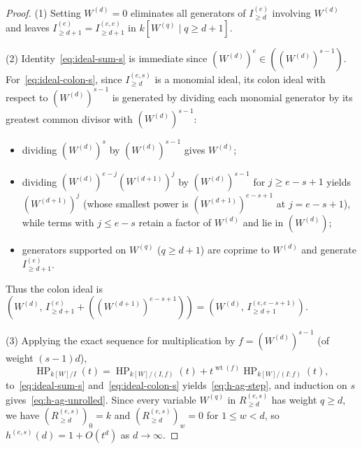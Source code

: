 \documentclass[a4paper, 12pt]{amsart}
\theoremstyle{remark}
\begin{document}
\begin{proof}
(1) Setting $W^{(d)} = 0$ eliminates all generators of $I_{\ge d}^{(e)}$ involving $W^{(d)}$ and leaves $I_{\ge d + 1}^{(e)} = I_{\ge d + 1}^{(e, e)}$ in $k[W^{(q)} \mid q \ge d + 1]$.

(2) Identity~\eqref{eq:ideal-sum-s} is immediate since $(W^{(d)})^e \in ((W^{(d)})^{s - 1})$.
For~\eqref{eq:ideal-colon-s},
since $I_{\ge d}^{(e, s)}$ is a monomial ideal,
its colon ideal with respect to $(W^{(d)})^{s - 1}$ is generated by dividing each monomial generator by its greatest common divisor with $(W^{(d)})^{s - 1}$:
\begin{itemize}
  \item dividing $(W^{(d)})^s$ by $(W^{(d)})^{s - 1}$ gives $W^{(d)}$;
  \item dividing $(W^{(d)})^{e - j}(W^{(d + 1)})^j$ by $(W^{(d)})^{s - 1}$ for $j \ge e - s + 1$ yields $(W^{(d + 1)})^j$
  (whose smallest power is $(W^{(d + 1)})^{e - s + 1}$ at $j = e - s + 1$),
  while terms with $j \le e - s$ retain a factor of $W^{(d)}$ and lie in $(W^{(d)})$;
  \item generators supported on $W^{(q)}$ ($q \ge d + 1$) are coprime to $W^{(d)}$ and generate $I_{\ge d + 1}^{(e)}$.
\end{itemize}
Thus the colon ideal is $\left(W^{(d)}, \, I_{\ge d + 1}^{(e)} + ((W^{(d + 1)})^{e - s + 1})\right) = \left(W^{(d)}, \, I_{\ge d + 1}^{(e, e - s + 1)}\right)$.

(3) Applying the exact sequence for multiplication by $f = (W^{(d)})^{s - 1}$ (of weight $(s - 1)d$),
\begin{equation*}
  \operatorname{HP}_{k[W]/I}(t) = \operatorname{HP}_{k[W]/(I, f)}(t) + t^{\operatorname{wt}(f)} \operatorname{HP}_{k[W]/(I : f)}(t),
\end{equation*}
to~\eqref{eq:ideal-sum-s} and~\eqref{eq:ideal-colon-s} yields~\eqref{eq:h-ag-step},
and induction on $s$ gives~\eqref{eq:h-ag-unrolled}.
Since every variable $W^{(q)}$ in $R_{\ge d}^{(e, s)}$ has weight $q \ge d$,
we have $\left(R_{\ge d}^{(e, s)}\right)_0 = k$ and $\left(R_{\ge d}^{(e, s)}\right)_w = 0$ for $1 \le w < d$,
so $h^{(e, s)}(d) = 1 + O(t^d)$ as $d \to \infty$.
\end{proof}
\end{document}
